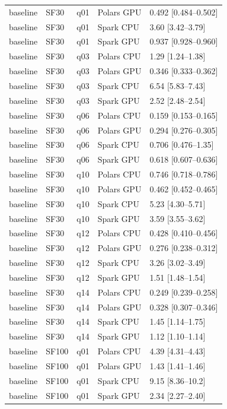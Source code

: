\begin{longtable}{lllll}
baseline & SF30 & q01 & Polars GPU & 0.492 [0.484--0.502] \\
baseline & SF30 & q01 & Spark CPU & 3.60 [3.42--3.79] \\
baseline & SF30 & q01 & Spark GPU & 0.937 [0.928--0.960] \\
baseline & SF30 & q03 & Polars CPU & 1.29 [1.24--1.38] \\
baseline & SF30 & q03 & Polars GPU & 0.346 [0.333--0.362] \\
baseline & SF30 & q03 & Spark CPU & 6.54 [5.83--7.43] \\
baseline & SF30 & q03 & Spark GPU & 2.52 [2.48--2.54] \\
baseline & SF30 & q06 & Polars CPU & 0.159 [0.153--0.165] \\
baseline & SF30 & q06 & Polars GPU & 0.294 [0.276--0.305] \\
baseline & SF30 & q06 & Spark CPU & 0.706 [0.476--1.35] \\
baseline & SF30 & q06 & Spark GPU & 0.618 [0.607--0.636] \\
baseline & SF30 & q10 & Polars CPU & 0.746 [0.718--0.786] \\
baseline & SF30 & q10 & Polars GPU & 0.462 [0.452--0.465] \\
baseline & SF30 & q10 & Spark CPU & 5.23 [4.30--5.71] \\
baseline & SF30 & q10 & Spark GPU & 3.59 [3.55--3.62] \\
baseline & SF30 & q12 & Polars CPU & 0.428 [0.410--0.456] \\
baseline & SF30 & q12 & Polars GPU & 0.276 [0.238--0.312] \\
baseline & SF30 & q12 & Spark CPU & 3.26 [3.02--3.49] \\
baseline & SF30 & q12 & Spark GPU & 1.51 [1.48--1.54] \\
baseline & SF30 & q14 & Polars CPU & 0.249 [0.239--0.258] \\
baseline & SF30 & q14 & Polars GPU & 0.328 [0.307--0.346] \\
baseline & SF30 & q14 & Spark CPU & 1.45 [1.14--1.75] \\
baseline & SF30 & q14 & Spark GPU & 1.12 [1.10--1.14] \\
baseline & SF100 & q01 & Polars CPU & 4.39 [4.31--4.43] \\
baseline & SF100 & q01 & Polars GPU & 1.43 [1.41--1.46] \\
baseline & SF100 & q01 & Spark CPU & 9.15 [8.36--10.2] \\
baseline & SF100 & q01 & Spark GPU & 2.34 [2.27--2.40] \\

\end{longtable}
